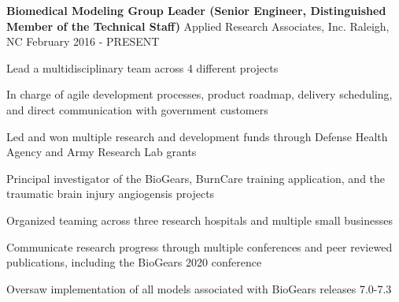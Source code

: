 
\begin{cventries}
  \cventry
    {\textbf{Biomedical Modeling Group Leader (Senior Engineer, Distinguished Member of the Technical Staff)}} %
    {Applied Research Associates, Inc.} %
    {Raleigh, NC} %
    {February 2016 - PRESENT} %
    {
      \begin{cvitems} %
        \item {Lead a multidisciplinary team across 4 different projects}
        \item {In charge of agile development processes, product roadmap, delivery scheduling, and direct communication with government customers}
        \item {Led and won multiple research and development funds through Defense Health Agency and Army Research Lab grants}
        \item {Principal investigator of the BioGears, BurnCare training application, and the traumatic brain injury angiogensis projects}
        \item {Organized teaming across three research hospitals and multiple small businesses}
        \item {Communicate research progress through multiple conferences and peer reviewed publications, including the BioGears 2020 conference}
        \item {Oversaw implementation of all models associated with BioGears releases 7.0-7.3}
      \end{cvitems}
    }



\end{cventries}
